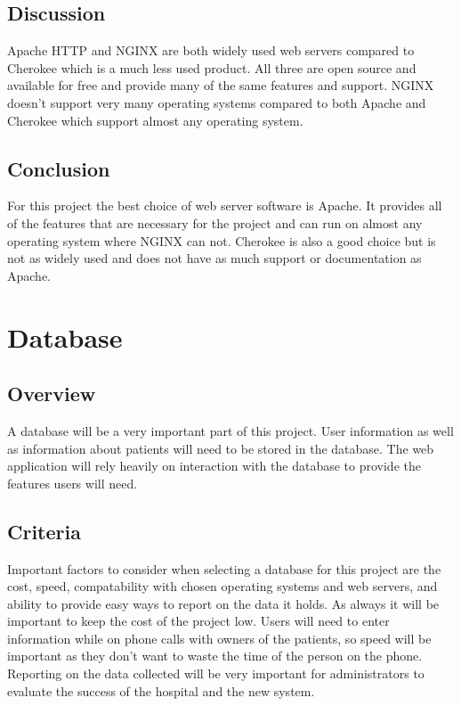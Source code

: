 \documentclass[onecolumn, draftclsnofoot,10pt, compsoc]{IEEEtran}
\begin{document}
\subsection{Discussion}
Apache HTTP and NGINX are both widely used web servers compared to Cherokee which is a much less used product. All three are open source and available for free and provide many of the same features and support. NGINX doesn't support very many operating systems compared to both Apache and Cherokee which support almost any operating system.

\subsection{Conclusion}
For this project the best choice of web server software is Apache. It provides all of the features that are necessary for the project and can run on almost any operating system where NGINX can not. Cherokee is also a good choice but is not as widely used and does not have as much support or documentation as Apache.

\section{Database}

\subsection{Overview}
A database will be a very important part of this project. User information as well as information about patients will need to be stored in the database. The web application will rely heavily on interaction with the database to provide the features users will need.

\subsection{Criteria}
Important factors to consider when selecting a database for this project are the cost, speed, compatability with chosen operating systems and web servers, and ability to provide easy ways to report on the data it holds. As always it will be important to keep the cost of the project low. Users will need to enter information while on phone calls with owners of the patients, so speed will be important as they don't want to waste the time of the person on the phone. Reporting on the data collected will be very important for administrators to evaluate the success of the hospital and the new system.
\end{document}
